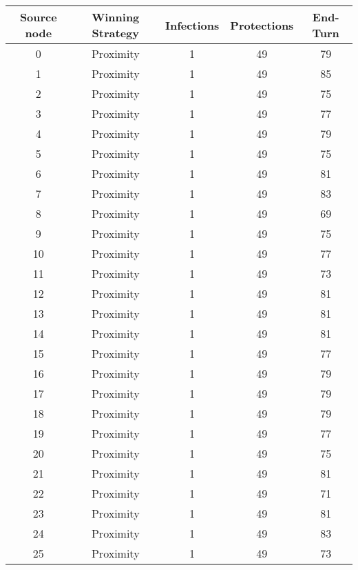 \documentclass[results.tex]{subfiles}
\begin{document}
\begin{center}
  \begin{tabular}{| c || c | c | c | c |}
    \hline
    {\bfseries Source node} & {\bfseries Winning Strategy} & {\bfseries Infections} & {\bfseries Protections} & {\bfseries End-Turn} \\  %
    \hline\hline
    0 & Proximity & 1 & 49 & 79 \\ 
    \hline
    1 & Proximity & 1 & 49 & 85 \\ 
    \hline
    2 & Proximity & 1 & 49 & 75 \\ 
    \hline
    3 & Proximity & 1 & 49 & 77 \\ 
    \hline
    4 & Proximity & 1 & 49 & 79 \\ 
    \hline
    5 & Proximity & 1 & 49 & 75 \\ 
    \hline
    6 & Proximity & 1 & 49 & 81 \\ 
    \hline
    7 & Proximity & 1 & 49 & 83 \\ 
    \hline
    8 & Proximity & 1 & 49 & 69 \\ 
    \hline
    9 & Proximity & 1 & 49 & 75 \\ 
    \hline
    10 & Proximity & 1 & 49 & 77 \\ 
    \hline
    11 & Proximity & 1 & 49 & 73 \\ 
    \hline
    12 & Proximity & 1 & 49 & 81 \\ 
    \hline
    13 & Proximity & 1 & 49 & 81 \\ 
    \hline
    14 & Proximity & 1 & 49 & 81 \\ 
    \hline
    15 & Proximity & 1 & 49 & 77 \\ 
    \hline
    16 & Proximity & 1 & 49 & 79 \\ 
    \hline
    17 & Proximity & 1 & 49 & 79 \\ 
    \hline
    18 & Proximity & 1 & 49 & 79 \\ 
    \hline
    19 & Proximity & 1 & 49 & 77 \\ 
    \hline
    20 & Proximity & 1 & 49 & 75 \\ 
    \hline
    21 & Proximity & 1 & 49 & 81 \\ 
    \hline
    22 & Proximity & 1 & 49 & 71 \\ 
    \hline
    23 & Proximity & 1 & 49 & 81 \\ 
    \hline
    24 & Proximity & 1 & 49 & 83 \\ 
    \hline
    25 & Proximity & 1 & 49 & 73 \\ 

\end{tabular}
\end{center}
\end{document}

